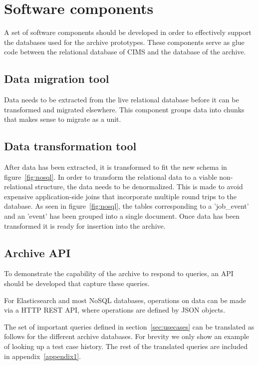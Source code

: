 \section{Software components}
A set of software components should be developed in order to effectively support the databases used for the archive prototypes. These components serve as glue code between the relational database of CIMS and the database of the archive. 
\subsection{Data migration tool}
Data needs to be extracted from the live relational database before it can be transformed and migrated elsewhere. This component groups data into chunks that makes sense to migrate as a unit. 

\subsection{Data transformation tool}
After data has been extracted, it is transformed to fit the new schema in figure~\ref{fig:nosql}. In order to transform the relational data to a viable non-relational structure, the data needs to be denormalized. This is made to avoid expensive application-side joins that incorporate multiple round trips to the database. As seen in figure~\ref{fig:nosql}, the tables corresponding to a 'job\_event' and an 'event' has been grouped into a single document. Once data has been transformed it is ready for insertion into the archive. 

\subsection{Archive API}
\label{sec:archiveapi}
To demonstrate the capability of the archive to respond to queries, an API should be developed that capture these queries. 

For Elasticsearch and most NoSQL databases, operations on data can be made via a HTTP REST API, where operations are defined by JSON objects.

The set of important queries defined in section~\ref{sec:usecases} can be translated as follows for the different archive databases. For brevity we only show an example of looking up a test case history. The rest of the translated queries are included in appendix~\ref{appendix1}.

